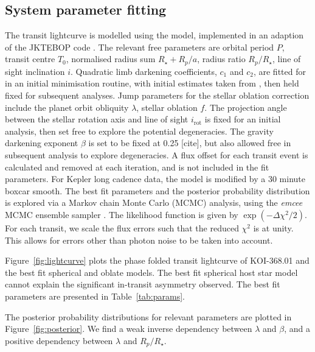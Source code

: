 \documentclass[preprint]{emulateapj}
\begin{document}
\subsection{System parameter fitting}
\label{sec:model-fitting}

The transit lightcurve is modelled using the
\citet{Nelson1972} model, implemented in an adaption of the
JKTEBOP code \citep{Proper1981,Southworth2004}. The
relevant free parameters are orbital period $P$, transit centre $T_0$,
normalised radius sum $R_\star+R_p / a$, radius ratio $R_p/R_\star$,
line of sight inclination $i$. Quadratic limb darkening coefficients,
$c_1$ and $c_2$, 
are fitted for in an initial minimisation routine, with initial
estimates taken from \citet{Sing2010}, then held fixed for subsequent analyses. Jump
parameters for the stellar oblation correction include the planet
orbit obliquity $\lambda$, stellar oblation $f$. The projection angle
between the stellar rotation axis and line of sight $i_\text{rot}$ is
fixed for an initial analysis, then set free to explore the potential
degeneracies. The gravity darkening exponent $\beta$ is set to be
fixed at 0.25 [cite], but also allowed free in subsequent analysis to
explore degeneracies. A flux offset for each transit event is calculated and
removed at each iteration, and is not included in the fit
parameters. For Kepler long cadence data, the model is modified by a
30 minute boxcar smooth. The best fit parameters and the posterior
probability distribution is explored via a Markov chain Monte Carlo
(MCMC) analysis, using the \emph{emcee} MCMC ensemble sampler
\citep{ForemanMackey2012}. The likelihood function is given by
$\exp(-\Delta\chi^2/2)$. For each transit, we scale the flux errors such
that the reduced $\chi^2$ is at unity. This allows for errors other
than photon noise to be taken into account.

Figure~\ref{fig:lightcurve} plots the phase folded transit lightcurve of
KOI-368.01 and the best fit spherical and oblate models. The best fit
spherical host star model cannot explain the significant in-transit
asymmetry observed. The best fit parameters are presented in Table~\ref{tab:params}.

The posterior probability distributions for relevant parameters
are plotted in Figure~\ref{fig:posterior}. We find a weak inverse dependency
between $\lambda$ and $\beta$, and a positive dependency between
$\lambda$ and $R_p/R_\star$.


\end{document}
